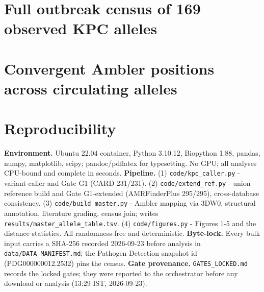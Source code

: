 \documentclass[11pt]{article}
\begin{document}
\clearpage

\clearpage


\clearpage
\appendix
\section{Full outbreak census of 169 observed KPC alleles}

\clearpage
\section{Convergent Ambler positions across circulating alleles}

\clearpage
\section{Reproducibility}
\textbf{Environment.} Ubuntu 22.04 container, Python 3.10.12, Biopython 1.88, pandas, numpy, matplotlib, scipy; pandoc/pdflatex for typesetting. No GPU; all analyses CPU-bound and complete in seconds.
\textbf{Pipeline.} (1) \texttt{code/kpc\_caller.py} - variant caller and Gate G1 (CARD 231/231). (2) \texttt{code/extend\_ref.py} - union reference build and Gate G1-extended (AMRFinderPlus 295/295), cross-database consistency. (3) \texttt{code/build\_master.py} - Ambler mapping via 3DW0, structural annotation, literature grading, census join; writes \texttt{results/master\_allele\_table.tsv}. (4) \texttt{code/figures.py} - Figures 1-5 and the distance statistics. All randomness-free and deterministic.
\textbf{Byte-lock.} Every bulk input carries a SHA-256 recorded 2026-09-23 before analysis in \texttt{data/DATA\_MANIFEST.md}; the Pathogen Detection snapshot id (PDG000000012.2532) pins the census.
\textbf{Gate provenance.} \texttt{GATES\_LOCKED.md} records the locked gates; they were reported to the orchestrator before any download or analysis (13:29 IST, 2026-09-23).
\end{document}
